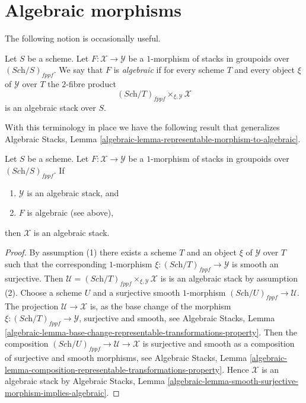 \section{Algebraic morphisms}
\label{section-algebraic}

\noindent
The following notion is occasionally useful.

\begin{definition}
\label{definition-algebraic}
Let $S$ be a scheme. Let $F : \mathcal{X} \to \mathcal{Y}$ be a
$1$-morphism of stacks in groupoids over $(\textit{Sch}/S)_{fppf}$.
We say that $F$ is {\it algebraic} if for every scheme $T$ and every
object $\xi$ of $\mathcal{Y}$ over $T$ the $2$-fibre product
$$
(\textit{Sch}/T)_{fppf} \times_{\xi, \mathcal{Y}} \mathcal{X}
$$
is an algebraic stack over $S$.
\end{definition}

\noindent
With this terminology in place we have the following result that generalizes
Algebraic Stacks, Lemma
\ref{algebraic-lemma-representable-morphism-to-algebraic}.

\begin{lemma}
\label{lemma-algebraic-morphism-to-algebraic}
Let $S$ be a scheme.
Let $F : \mathcal{X} \to \mathcal{Y}$ be a $1$-morphism of
stacks in groupoids over $(\textit{Sch}/S)_{fppf}$. If
\begin{enumerate}
\item $\mathcal{Y}$ is an algebraic stack, and
\item $F$ is algebraic (see above),
\end{enumerate}
then $\mathcal{X}$ is an algebraic stack.
\end{lemma}

\begin{proof}
By assumption (1) there exists a scheme $T$ and an object
$\xi$ of $\mathcal{Y}$ over $T$ such that the corresponding
$1$-morphism $\xi : (\textit{Sch}/T)_{fppf} \to \mathcal{Y}$
is smooth an surjective. Then
$\mathcal{U} = (\textit{Sch}/T)_{fppf} \times_{\xi, \mathcal{Y}} \mathcal{X}$
is is an algebraic stack by assumption (2).
Choose a scheme $U$ and a surjective smooth $1$-morphism
$(\textit{Sch}/U)_{fppf} \to \mathcal{U}$.
The projection $\mathcal{U} \longrightarrow \mathcal{X}$
is, as the base change of the morphism
$\xi : (\textit{Sch}/T)_{fppf} \to \mathcal{Y}$,
surjective and smooth, see
Algebraic Stacks, Lemma
\ref{algebraic-lemma-base-change-representable-transformations-property}.
Then the composition
$(\textit{Sch}/U)_{fppf} \to \mathcal{U} \to \mathcal{X}$
is surjective and smooth as a composition of surjective and smooth
morphisms, see
Algebraic Stacks, Lemma
\ref{algebraic-lemma-composition-representable-transformations-property}.
Hence $\mathcal{X}$ is an algebraic stack by
Algebraic Stacks, Lemma
\ref{algebraic-lemma-smooth-surjective-morphism-implies-algebraic}.
\end{proof}

